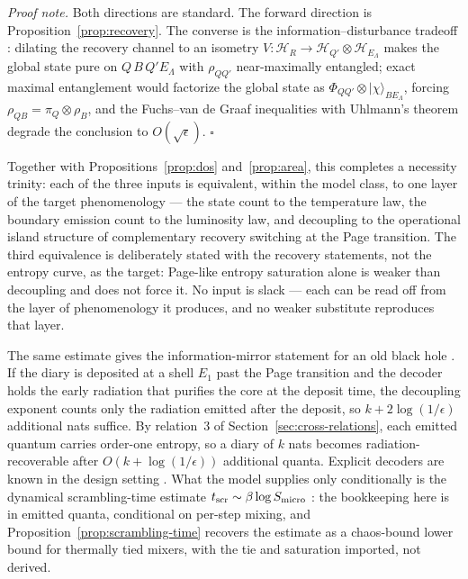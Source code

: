 \documentclass[12pt]{article}
\newcommand{\Smicro}{S_{\rm micro}}
\newcommand{\ket}[1]{|#1\rangle}
\begin{document}
\emph{Proof note.}  Both directions are standard.  The forward direction
is Proposition~\ref{prop:recovery}.  The converse is the
information--disturbance tradeoff
\cite{Schumacher1996,KretschmannSchlingemannWerner2008}: dilating the
recovery channel to an isometry
$V:\mathcal H_R\to\mathcal H_{Q'}\otimes\mathcal H_{E_\Lambda}$ makes the
global state pure on $Q\,B\,Q'E_\Lambda$ with $\rho_{QQ'}$
near-maximally entangled; exact maximal entanglement would factorize the
global state as $\Phi_{QQ'}\otimes\ket\chi_{BE_\Lambda}$, forcing
$\rho_{QB}=\pi_Q\otimes\rho_B$, and the Fuchs--van de Graaf inequalities
with Uhlmann's theorem degrade the conclusion to $O(\sqrt\epsilon)$.
\hfill$\square$

Together with Propositions~\ref{prop:dos} and~\ref{prop:area}, this
completes a necessity trinity: each of the three inputs is equivalent,
within the model class, to one layer of the target phenomenology --- the
state count to the temperature law, the boundary emission count to the
luminosity law, and decoupling to the operational island structure of
complementary recovery switching at the Page transition.  The third
equivalence is deliberately stated with the recovery statements, not the
entropy curve, as the target: Page-like entropy saturation alone is weaker
than decoupling and does not force it.  No input is slack --- each can be
read off from the layer of phenomenology it produces, and no weaker
substitute reproduces that layer.

The same estimate gives the information-mirror statement for an old black
hole \cite{HaydenPreskill2007}.  If the diary is deposited at a shell $E_1$
past the Page transition and the decoder holds the early radiation that
purifies the core at the deposit time, the decoupling exponent counts only
the radiation emitted after the deposit, so $k+2\log(1/\epsilon)$ additional
nats suffice.  By relation~3 of Section~\ref{sec:cross-relations}, each
emitted quantum carries order-one entropy, so a diary of $k$ nats becomes
radiation-recoverable after $O(k+\log(1/\epsilon))$ additional quanta.
Explicit decoders are known in the design setting \cite{YoshidaKitaev2017}.
What the model supplies only conditionally is the dynamical scrambling-time
estimate $t_{\rm scr}\sim\beta\log\Smicro$ \cite{SekinoSusskind2008}: the
bookkeeping here is in emitted quanta, conditional on per-step mixing, and
Proposition~\ref{prop:scrambling-time} recovers the estimate as a chaos-bound
lower bound for thermally tied mixers, with the tie and saturation
imported, not derived.
\end{document}
